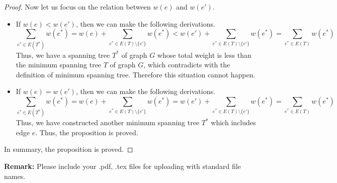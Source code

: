 \documentclass[12pt,a4paper]{article}
\theoremstyle{definition}
\begin{document}
\begin{enumerate}
\begin{enumerate}
\begin{proof}
    Now let us focus on the relation between $w(e)$ and $w(e')$.
    \begin{itemize}
    \item If $w(e) < w(e')$, then we can make the following derivations.
    \begin{displaymath}
    \sum_{e^* \in E(T^*)} w(e^*) = w(e) + \sum_{e^* \in E(T)\setminus\{e'\}} w(e^*) < w(e') + \sum_{e^* \in E(T)\setminus\{e'\}} w(e^*) = \sum_{e^* \in E(T)} w(e^*)
    \end{displaymath}
    Thus, we have a spanning tree $T^*$ of graph $G$ whose total weight is less than the minimum spanning tree $T$ of graph $G$, which contradicts with the definition of minimum spanning tree. Therefore this situation cannot happen.
    \item If $w(e) = w(e')$, then we can make the following derivations.
    \begin{displaymath}
    \sum_{e^* \in E(T^*)} w(e^*) = w(e) + \sum_{e^* \in E(T)\setminus\{e'\}} w(e^*) = w(e') + \sum_{e^* \in E(T)\setminus\{e'\}} w(e^*) = \sum_{e^* \in E(T)} w(e^*)
    \end{displaymath}
    Thus, we have constructed another minimum spanning tree $T^*$ which includes edge $e$. Thus, the proposition is proved.
    \end{itemize}
    In summary, the proposition is proved.
    \end{proof}
    \end{enumerate}
\end{enumerate}



\textbf{Remark:} Please include your .pdf, .tex files for uploading with standard file names.


\end{document}
